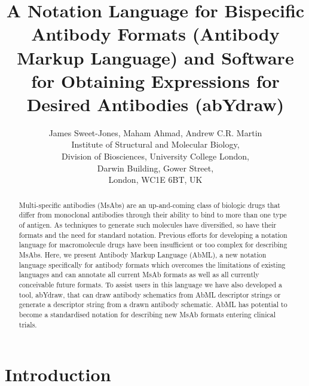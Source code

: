 \documentclass[a4]{article}
\title{A Notation Language for Bispecific Antibody Formats (Antibody
Markup Language) and Software for Obtaining Expressions for Desired
Antibodies (abYdraw)}
\author{James Sweet-Jones, Maham Ahmad, Andrew C.R. Martin\\
Institute of Structural and Molecular Biology,\\
Division of Biosciences, University College London,\\
Darwin Building, Gower Street,\\
London, WC1E 6BT, UK}
\begin{document}
\maketitle

\begin{abstract}
Multi-specific antibodies (MsAbs) are an up-and-coming class of biologic
drugs that differ from monoclonal antibodies through their ability to
bind to more than one type of antigen. As techniques to generate such
molecules have diversified, so have their formats and the need for
standard notation. Previous efforts for developing a notation language
for macromolecule drugs have been insufficient or too complex for describing
MsAbs. Here, we present Antibody Markup Language (AbML), a new
notation language specifically for antibody formats which overcomes
the limitations of existing languages and can annotate all
current MsAb formats as well as all currently conceivable future formats.
To assist users in this language we have also
developed a tool, abYdraw, that can draw antibody schematics from AbML
descriptor strings or generate a descriptor string from a drawn
antibody schematic. AbML has potential to become a standardised
notation for describing new MsAb formats entering clinical trials.
\end{abstract}

\section{Introduction}
\end{document}

